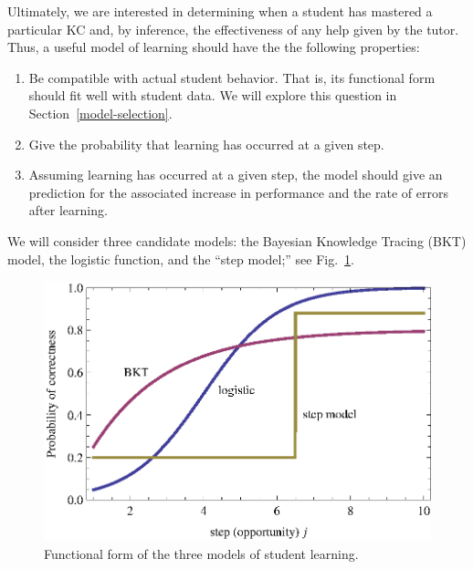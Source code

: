 \documentclass{edm_template}
\begin{document}
Ultimately, we are interested in determining when a student has mastered
a particular KC and, by inference, the effectiveness of
any help given by the tutor.  Thus, a useful model of learning
should  have the the following properties:
\label{model-criteria}
%
\begin{enumerate} 

\item Be compatible with actual student behavior.
      That is, its
      functional form should fit well with student data.
      We will explore this question in Section~\ref{model-selection}.  

\item \label{crit:step}
      Give the probability that learning has occurred at a given step.

\item  \label{crit:perform}
     Assuming learning has occurred at a given step, the model
     should give an prediction for the 
     associated increase in performance and 
     the rate of errors after learning.

\end{enumerate}
%
We will consider three candidate models:  
the Bayesian Knowledge Tracing (BKT) model, the logistic function,
and the ``step model;''
see Fig.~\ref{three-models}.

\begin{figure}
  \centering \includegraphics{three-models.eps}
  \caption{Functional form of the three models of student learning.}
    \label{three-models}
\end{figure}
\end{document}
